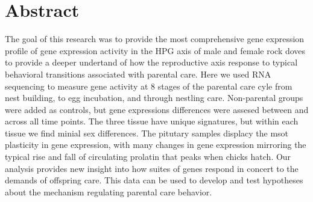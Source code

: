 \documentclass[10pt,letterpaper]{article}
\newcommand{\getIndex}[2]{
  \ForEach{,}{\IfEq{#1}{\thislevelitem}{\number\thislevelcount\ExitForEach}{}}{#2}
}
\newcommand{\getAff}[1]{
  \getIndex{#1}{UC Davis,UNH}
}
\begin{document}
\vspace*{0.2in}

\section*{Abstract}
The goal of this research was to provide the most comprehensive gene
expression profile of gene expression activity in the HPG axis of male
and female rock doves to provide a deeper undertand of how the
reproductive axis response to typical behavioral transitions associated
with parental care. Here we used RNA sequencing to measure gene activity
at 8 stages of the parental care cyle from nest building, to egg
incubation, and through nestling care. Non-parental groups were added as
controls, but gene expressions differences were assesed between and
across all time points. The three tissue have unique signatures, but
within each tissue we find minial sex differences. The pitutary samples
displacy the msot plasticity in gene expression, with many changes in
gene expression mirroring the typical rise and fall of circulating
prolatin that peaks when chicks hatch. Our analysis provides new insight
into how suites of genes respond in concert to the demands of offspring
care. This data can be used to develop and test hypotheses about the
mechanism regulating parental care behavior.
\end{document}
